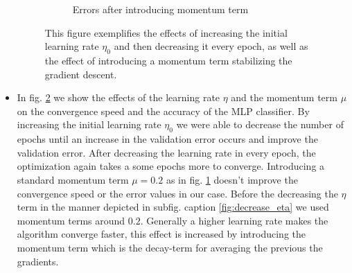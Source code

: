 \begin{itemize}
\begin{figure}[!ht]
\begin{subfigure}[b]{.45\textwidth}
		\caption{Errors after introducing momentum term}
		\label{fig:increase_momentum}
		\end{subfigure}
		\caption{This figure exemplifies the effects of increasing the initial learning rate $\eta_0$ and then decreasing it every epoch, as well as the effect of introducing a momentum term stabilizing the gradient descent.}
		\label{fig:effects_learning_rate}
		\end{figure}
	\item In fig. \ref{fig:effects_learning_rate} we show the effects of the learning rate $\eta$ and the momentum term $\mu$ on the convergence speed and the accuracy of the MLP classifier. By increasing the initial learning rate $\eta_0$ we were able to decrease the number of epochs until an increase in the validation error occurs and improve the validation error. After decreasing the learning rate in every epoch, the optimization again takes a some epochs more to converge. Introducing a standard momentum term $\mu = 0.2$ as in fig. \ref{fig:increase_momentum} doesn't improve the convergence speed or the error values in our case. Before the decreasing the $\eta$ term in the manner depicted in subfig. caption \ref{fig:decrease_eta} we used momentum terms around $0.2$. Generally a higher learning rate makes the algorithm converge faster, this effect is increased by introducing the momentum term which is the decay-term for averaging the previous the gradients.  


\end{itemize}
